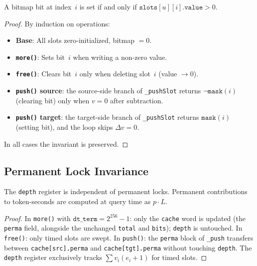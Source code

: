 \documentclass[10pt,a4paper,twocolumn]{article}
\begin{document}
\begin{theorem}
\label{thm:bitmap}
A bitmap bit at index~$i$ is set if and only if $\texttt{slots}[u][i].\texttt{value} > 0$.
\end{theorem}

\begin{proof}
By induction on operations:
\begin{itemize}[nosep]
\item \textbf{Base}: All slots zero-initialized, bitmap $= 0$.
\item \textbf{\texttt{more()}}: Sets bit~$i$ when writing a non-zero value.
\item \textbf{\texttt{free()}}: Clears bit~$i$ only when deleting slot~$i$ (value $\to 0$).
\item \textbf{\texttt{push()} source}: the source-side branch of \texttt{\_pushSlot} returns $\lnot\texttt{mask}(i)$ (clearing bit) only when $v = 0$ after subtraction.
\item \textbf{\texttt{push()} target}: the target-side branch of \texttt{\_pushSlot} returns $\texttt{mask}(i)$ (setting bit), and the loop skips $\Delta v = 0$.
\end{itemize}
In all cases the invariant is preserved.
\end{proof}

\subsection{Permanent Lock Invariance}

\begin{theorem}
\label{thm:perma-independence}
The \texttt{depth} register is independent of permanent locks. Permanent contributions to token-seconds are computed at query time as $p \cdot L$.
\end{theorem}

\begin{proof}
In \texttt{more()} with $\texttt{dt\_term} = 2^{256}{-}1$: only the \texttt{cache} word is updated (the \texttt{perma} field, alongside the unchanged \texttt{total} and \texttt{bits}); \texttt{depth} is untouched. In \texttt{free()}: only timed slots are swept. In \texttt{push()}: the \texttt{perma} block of \texttt{\_push} transfers between \texttt{cache[src].perma} and \texttt{cache[tgt].perma} without touching \texttt{depth}. The \texttt{depth} register exclusively tracks $\sum v_i(e_i{+}1)$ for timed slots.
\end{proof}
\end{document}
